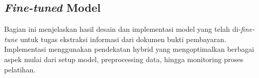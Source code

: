 \subsection{\emph{Fine-tuned} \donut{} Model}
\label{subsec:fine-tuned-model}

Bagian ini menjelaskan hasil desain dan implementasi model \donut{} yang telah di-\emph{fine-tune} untuk tugas ekstraksi informasi dari dokumen bukti pembayaran. Implementasi menggunakan pendekatan hybrid yang mengoptimalkan berbagai aspek mulai dari setup model, preprocessing data, hingga monitoring proses pelatihan.

